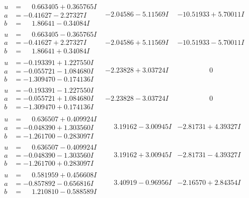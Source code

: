 \documentclass[1p]{elsarticle_modified}
\theoremstyle{definition}
\begin{document}
$$\begin{array}{c|c|c}
\begin{aligned}
u &= \phantom{-}0.663405 + 0.365765 I \\
a &= -0.41627 - 2.27327 I \\
b &= \phantom{-}1.86641 - 0.34084 I\end{aligned}
 & -2.04586 - 5.11569 I & -10.51933 + 5.70011 I \\ \hline\begin{aligned}
u &= \phantom{-}0.663405 - 0.365765 I \\
a &= -0.41627 + 2.27327 I \\
b &= \phantom{-}1.86641 + 0.34084 I\end{aligned}
 & -2.04586 + 5.11569 I & -10.51933 - 5.70011 I \\ \hline\begin{aligned}
u &= -0.193391 + 1.227550 I \\
a &= -0.055721 - 1.084680 I \\
b &= -1.309470 - 0.174136 I\end{aligned}
 & -2.23828 + 3.03724 I & \phantom{-0.000000 } 0 \\ \hline\begin{aligned}
u &= -0.193391 - 1.227550 I \\
a &= -0.055721 + 1.084680 I \\
b &= -1.309470 + 0.174136 I\end{aligned}
 & -2.23828 - 3.03724 I & \phantom{-0.000000 } 0 \\ \hline\begin{aligned}
u &= \phantom{-}0.636507 + 0.409924 I \\
a &= -0.048390 + 1.303560 I \\
b &= -1.261700 - 0.283097 I\end{aligned}
 & \phantom{-}3.19162 - 3.00945 I & -2.81731 + 4.39327 I \\ \hline\begin{aligned}
u &= \phantom{-}0.636507 - 0.409924 I \\
a &= -0.048390 - 1.303560 I \\
b &= -1.261700 + 0.283097 I\end{aligned}
 & \phantom{-}3.19162 + 3.00945 I & -2.81731 - 4.39327 I \\ \hline\begin{aligned}
u &= \phantom{-}0.581959 + 0.456608 I \\
a &= -0.857892 - 0.656816 I \\
b &= \phantom{-}1.210810 - 0.588589 I\end{aligned}
 & \phantom{-}3.40919 - 0.96956 I & -2.16570 + 2.84354 I \\ \hline\begin{aligned}

\end{aligned}
\end{array}$$
\end{document}
